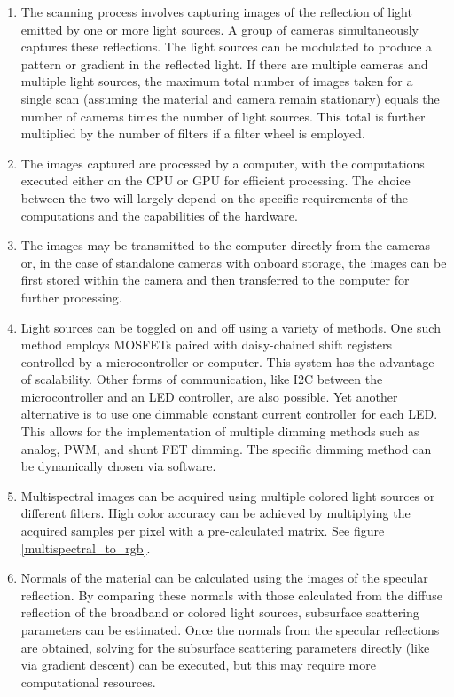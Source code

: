 \documentclass[11pt, twoside, listof=totocnumbered, bibliography=totocnumbered]{scrartcl}
\begin{document}
\begin{enumerate}
	\item The scanning process involves capturing images of the reflection of light emitted by one or more light sources. A group of cameras simultaneously captures these reflections. The light sources can be modulated to produce a pattern or gradient in the reflected light. If there are multiple cameras and multiple light sources, the maximum total number of images taken for a single scan (assuming the material and camera remain stationary) equals the number of cameras times the number of light sources. This total is further multiplied by the number of filters if a filter wheel is employed.
	
	\item The images captured are processed by a computer, with the computations executed either on the CPU or GPU for efficient processing. The choice between the two will largely depend on the specific requirements of the computations and the capabilities of the hardware.
	
	\item The images may be transmitted to the computer directly from the cameras or, in the case of standalone cameras with onboard storage, the images can be first stored within the camera and then transferred to the computer for further processing.
	
	\item Light sources can be toggled on and off using a variety of methods. One such method employs MOSFETs paired with daisy-chained shift registers controlled by a microcontroller or computer. This system has the advantage of scalability. Other forms of communication, like I2C between the microcontroller and an LED controller, are also possible. Yet another alternative is to use one dimmable constant current controller for each LED. This allows for the implementation of multiple dimming methods such as analog, PWM, and shunt FET dimming. The specific dimming method can be dynamically chosen via software.
	
	\item Multispectral images can be acquired using multiple colored light sources or different filters. High color accuracy can be achieved by multiplying the acquired samples per pixel with a pre-calculated matrix. See figure \ref{multispectral_to_rgb}.
	
	\item Normals of the material can be calculated using the images of the specular reflection. By comparing these normals with those calculated from the diffuse reflection of the broadband or colored light sources, subsurface scattering parameters can be estimated. Once the normals from the specular reflections are obtained, solving for the subsurface scattering parameters directly (like via gradient descent) can be executed, but this may require more computational resources. \cite{SSS}
\end{enumerate}
\end{document}
